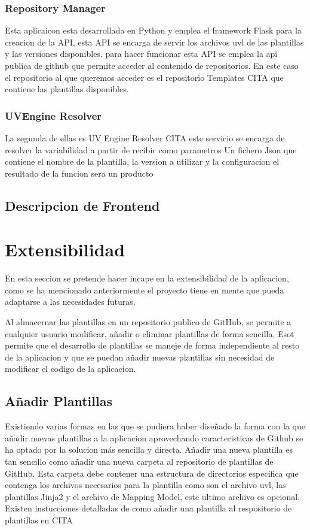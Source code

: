 \documentclass[12pt, a4paper, twoside]{article}
\begin{document}
\subsubsection{Repository Manager}
Esta aplicaicon esta desarrollada en Python y emplea el framework Flask para la creacion de la API, esta API se encarga de servir los archivos uvl de las plantillas y las versiones disponibles.
para hacer funcionar esta API se emplea la api publica de github que permite acceder al contenido de repositorios. 
En este caso el repositorio al que queremos acceder es el repositorio Templates CITA que contiene las plantillas disponibles.
\subsubsection{UVEngine Resolver}

La segunda de ellas es UV Engine Resolver CITA este servicio se encarga de resolver la variabilidad a partir de recibir como parametros Un fichero Json que contiene el nombre de la plantilla, la version a utilizar y la configuracion 
el resultado de la funcion sera un producto
\subsection{Descripcion de Frontend}



\section{Extensibilidad}
\label{sec:Extensibilidad}
En esta seccion se pretende hacer incape en la extensibilidad de la aplicacion, como se ha mencionado anteriormente el proyecto tiene en mente que pueda adaptarse a las necesidades futuras.

Al almacernar las plantillas en un repositorio publico de GitHub, se permite a cualquier usuario modificar, añadir o eliminar plantillas de forma sencilla.
Esot permite que el desarrollo de plantillas se maneje de forma independiente al resto de la aplicacion y que se puedan añadir nuevas plantillas sin necesidad de modificar el codigo de la aplicacion.
\subsection{Añadir Plantillas}
Existiendo varias formas en las que se pudiera haber diseñado la forma con la que añadir nuevas plantillas a la aplicacion aprovechando caracteristicas de Github se ha optado por la solucion más sencilla y directa.
Añadir una nueva plantilla es tan sencillo como añadir una nueva carpeta al repositorio de plantillas de GitHub.
Esta carpeta debe contener una estructura de directorios especifica que contenga los archivos necesarios para la plantilla como son el archivo uvl, las plantillas Jinja2 y el archivo de Mapping Model, este ultimo archivo es opcional.
Existen instucciones detalladas de como añadir una plantilla al respositorio de plantillas en CITA 
\end{document}
